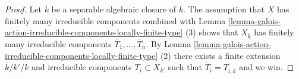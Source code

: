 \documentclass[10pt,a4paper]{amsart}
\theoremstyle{plain}
\theoremstyle{definition}
\theoremstyle{remark}
\numberwithin{equation}{subsection}
\begin{document}
\begin{proof}
Let $\overline{k}$ be a separable algebraic closure of $k$.
The assumption that $X$ has finitely many irreducible components
combined with
Lemma \ref{lemma-galois-action-irreducible-components-locally-finite-type} (3)
shows that $X_{\overline{k}}$ has finitely many irreducible components
$\overline{T}_1, \ldots, \overline{T}_n$. By
Lemma \ref{lemma-galois-action-irreducible-components-locally-finite-type} (2)
there exists a finite extension $\overline{k}/k'/k$ and
irreducible components $T_i \subset X_{k'}$ such that
$\overline{T}_i = T_{i, \overline{k}}$ and we win.
\end{proof}
\end{document}
